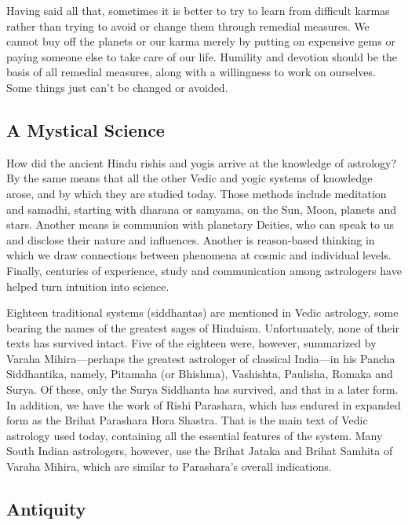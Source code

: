  

Having said all that, sometimes it is better to try to learn from difficult karmas rather than trying to avoid or change them through remedial measures. We cannot buy off the planets or our karma merely by putting on expensive gems or paying someone else to take care of our life. Humility and devotion should be the basis of all remedial measures, along with a willingness to work on ourselves. Some things just can’t be changed or avoided.

 

\subsection{A Mystical Science}
 

How did the ancient Hindu rishis and yogis arrive at the knowledge of astrology? By the same means that all the other Vedic and yogic systems of knowledge arose, and by which they are studied today. Those methods include meditation and samadhi, starting with dharana or samyama, on the Sun, Moon, planets and stars. Another means is communion with planetary Deities, who can speak to us and disclose their nature and influences. Another is reason-based thinking in which we draw connections between phenomena at cosmic and individual levels. Finally, centuries of experience, study and communication among astrologers have helped turn intuition into science.

 

Eighteen traditional systems (siddhantas) are mentioned in Vedic astrology, some bearing the names of the greatest sages of Hinduism. Unfortunately, none of their texts has survived intact. Five of the eighteen were, however, summarized by Varaha ­Mihira—perhaps the greatest astrologer of classical India—in his Pancha Siddhan­tika, namely, Pitamaha (or Bhishma), Vashishta, Paulisha, Romaka and Surya. Of these, only the Surya Siddhanta has survived, and that in a later form. In addition, we have the work of Rishi Parashara, which has endured in expanded form as the Brihat Parashara Hora Shastra. That is the main text of Vedic astrology used today, containing all the essential features of the system. Many South Indian astrologers, however, use the Brihat Jataka and Brihat Samhita of Varaha Mihira, which are similar to Parashara’s overall indications.

 

\subsection{Antiquity}
 

